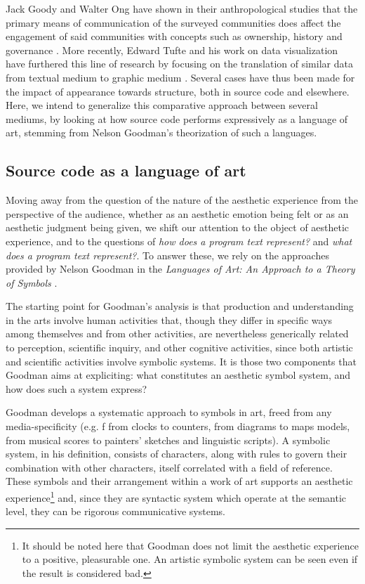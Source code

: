 Jack Goody and Walter Ong have shown in their anthropological studies that the primary means of communication of the surveyed communities does affect the engagement of said communities with concepts such as ownership, history and governance \citep{ong_orality_2012,goody_logic_1986}. More recently, Edward Tufte and his work on data visualization have furthered this line of research by focusing on the translation of similar data from textual medium to graphic medium \citep{tufte_visual_2001}. Several cases have thus been made for the impact of appearance towards structure, both in source code and elsewhere. Here, we intend to generalize this comparative approach between several mediums, by looking at how source code performs expressively as a language of art, stemming from Nelson Goodman's theorization of such a languages.

\subsection{Source code as a language of art}
\label{subsec:source-code-language-art}

Moving away from the question of the nature of the aesthetic experience from the perspective of the audience, whether as an aesthetic emotion being felt or as an aesthetic judgment being given, we shift our attention to the object of aesthetic experience, and to the questions of \emph{how does a program text represent?} and \emph{what does a program text represent?}. To answer these, we rely on the approaches provided by Nelson Goodman in the \emph{Languages of Art: An Approach to a Theory of Symbols} \citep{goodman_languages_1976}.

The starting point for Goodman's analysis is that production and understanding in the arts involve human activities that, though they differ in specific ways among themselves and from other activities, are nevertheless generically related to perception, scientific inquiry, and other cognitive activities, since both artistic and scientific activities involve symbolic systems. It is those two components that Goodman aims at expliciting: what constitutes an aesthetic symbol system, and how does such a system express?

Goodman develops a systematic approach to symbols in art, freed from any media-specificity (e.g. f from clocks to counters, from diagrams to maps models, from musical scores to painters' sketches and linguistic scripts). A symbolic system, in his definition, consists of characters, along with rules to govern their combination with other characters, itself correlated with a field of reference. These symbols and their arrangement within a work of art supports an aesthetic experience\footnote{It should be noted here that Goodman does not limit the aesthetic experience to a positive, pleasurable one. An artistic symbolic system can be seen even if the result is considered bad.} and, since they are syntactic system which operate at the semantic level, they can be rigorous communicative systems.

